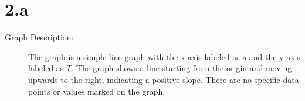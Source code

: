 \section*{2.a}

\begin{description}
    \item[Graph Description:] The graph is a simple line graph with the x-axis labeled as $s$ and the y-axis labeled as $T$. The graph shows a line starting from the origin and moving upwards to the right, indicating a positive slope. There are no specific data points or values marked on the graph.
\end{description}